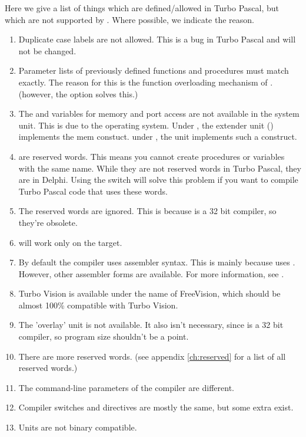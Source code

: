 Here we give a list of things which are defined/allowed in Turbo Pascal, but
which are not supported by \fpc. Where possible, we indicate the reason.
\begin{enumerate}
\item Duplicate case labels are not allowed. This is a bug in Turbo Pascal
and will not be changed.
\item Parameter lists of previously defined functions and procedures must
match exactly. The reason for this is the function overloading mechanism of
\fpc. (however, the  option solves this.)
\item The  and  variables for memory and port
access are not available in the system unit. This is due to the operating system. Under
\dos, the extender unit () implements the mem constuct.
under \linux, the  unit implements such a construct.
\item {}
are reserved words. This means you cannot create procedures or variables
with the same name. While they are not reserved words in Turbo Pascal,
they are in Delphi. Using the  switch will solve this problem if
you want to compile Turbo Pascal code that uses these words.
\item The reserved words  are ignored. This is
because \fpc is a 32 bit compiler, so they're obsolete.
\item {} will work only on the \dos target.
\item By default the compiler uses   assembler syntax.
This is mainly because \fpc uses \gnu {}. However, other assembler
forms are available. For more information, see \progref.
\item Turbo Vision is available under the name of FreeVision, which should
be almost 100\% compatible with Turbo Vision.
\item The 'overlay' unit is not available. It also isn't necessary, since
\fpc is a 32 bit compiler, so program size shouldn't be a point.
\item There are more reserved words. (see appendix \ref{ch:reserved} for a
list of all reserved words.)
\item The command-line parameters of the compiler are different.
\item Compiler switches and directives are mostly the same, but some extra
exist.
\item Units are not binary compatible.

\end{enumerate}
